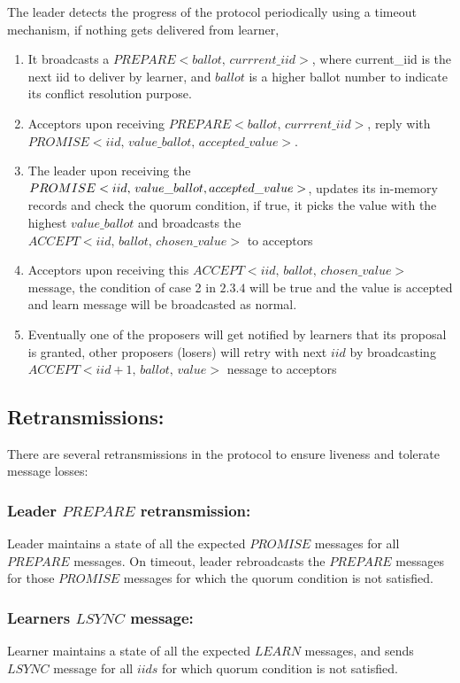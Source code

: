 \noindent
The leader detects the progress of the protocol periodically using a timeout mechanism, if nothing gets delivered from learner, 
\begin{enumerate}
\item It broadcasts a $PREPARE<ballot,\,currrent\_iid>$, where current\_iid is the next iid to deliver by learner, and $ballot$ is a higher ballot number to indicate its conflict resolution purpose. 
\item Acceptors upon receiving $PREPARE<ballot,\, currrent\_iid>$, reply with $PROMISE<iid,\, value\_ballot,\, accepted\_value>$.
\item The leader upon receiving the $PROMISE<iid,\, value\_ballot,\,\\ accepted\_value>$, updates its in-memory records and check the quorum condition, if true, it picks the value with the highest $value\_ballot$ and broadcasts the $ACCEPT<iid, \, ballot,\, chosen\_value>$ to acceptors
\item Acceptors upon receiving this $ACCEPT<iid, \, ballot,\, chosen\_value>$ message, the condition of case 2 in $2.3.4$ will be true and the value is accepted and learn message will be broadcasted as normal. 
\item Eventually one of the proposers will get notified by learners that its proposal is granted, other proposers (losers) will retry with next $iid$ by broadcasting $ACCEPT<iid+1, \, ballot, \, value>$ nessage to acceptors
\end{enumerate}

\subsection{Retransmissions:}
There are several retransmissions in the protocol to ensure liveness and tolerate message losses:
\subsubsection{Leader $PREPARE$ retransmission:}
Leader maintains a state of all the expected $PROMISE$ messages for all $PREPARE$ messages. On timeout, leader rebroadcasts the $PREPARE$ messages for those $PROMISE$ messages for which the quorum condition is not satisfied.
\subsubsection{Learners $LSYNC$ message:}
Learner maintains a state of all the expected $LEARN$ messages, and sends $LSYNC$ message for all $iids$ for which quorum condition is not satisfied. \\

